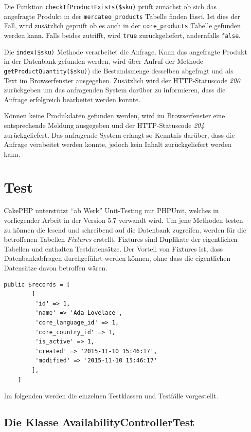 {	Die Funktion \texttt{checkIfProductExists(\$sku)} prüft zunächst ob sich das angefragte Produkt in der \texttt{mercateo\_products} Tabelle finden lässt. Ist dies der Fall, wird zusätzlich geprüft ob es auch in der \texttt{core\_products} Tabelle gefunden werden kann. Falls beides zutrifft, wird \texttt{true} zurückgeliefert, andernfalls \texttt{false}.
	
	Die \texttt{index(\$sku)} Methode verarbeitet die Anfrage. Kann das angefragte Produkt in der Datenbank gefunden werden, wird über Aufruf der Methode \texttt{getProductQuantity(\$sku)}) die Bestandsmenge desselben abgefragt und als Text im Browserfenster ausgegeben. Zusätzlich wird der HTTP-Statuscode \textit{200} zurückgeben um das anfragenden System darüber zu informieren, dass die Anfrage erfolgreich bearbeitet werden konnte.
	
	Können keine Produkdaten gefunden werden, wird im Browserfenster eine entsprechende Meldung ausgegeben und der HTTP-Statuscode \textit{204} zurückgeliefert. Das anfragende System erlangt so Kenntnis darüber, dass die Anfrage verabeitet werden konnte, jedoch kein Inhalt zurückgeliefert werden kann.
	
	\section{Test}
	
	
	CakePHP unterstützt \enquote{ab Werk} Unit-Testing mit PHPUnit, welches in vorliegender Arbeit in der Version 5.7 verwandt wird. Um jene Methoden testen zu können die lesend und schreibend auf die Datenbank zugreifen, werden für die betroffenen Tabellen \textit{Fixtures} erstellt. Fixtures sind Duplikate der eigentlichen Tabellen und enthalten Testdatensätze. Der Vorteil von Fixtures ist, dass Datenbankabfragen durchgeführt werden können, ohne dass die eigentlichen Datensätze davon betroffen wären.
	\begin{lstlisting}[caption={Beispieleintrag in der Klasse \texttt{CoreSellersFixture}}]
	public $records = [
		[
		 'id' => 1,
		 'name' => 'Ada Lovelace',
		 'core_language_id' => 1,
		 'core_country_id' => 1,
		 'is_active' => 1,
		 'created' => '2015-11-10 15:46:17',
		 'modified' => '2015-11-10 15:46:17'
		],
	]
	\end{lstlisting}
	
	Im folgenden werden die einzelnen Testklassen und Testfälle vorgestellt.
	
	\subsection{Die Klasse AvailabilityControllerTest}
	
}
